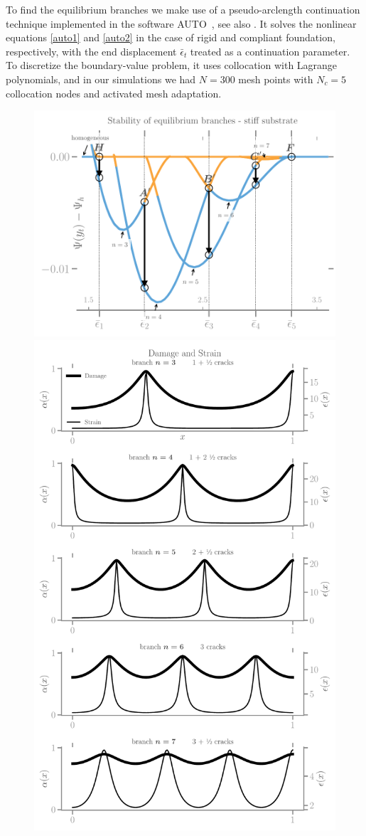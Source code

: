 To find the equilibrium branches we make use of a pseudo-arclength continuation technique implemented in the software AUTO~\cite{Doedel1981-sa},  see also \cite{Pattamatta2014-pn}. It solves the nonlinear equations \ref{auto1} and \ref{auto2} in the case of rigid and compliant foundation, respectively, with the end displacement $\bar\epsilon_t$ treated as a continuation parameter. To discretize the boundary-value problem, it uses collocation with Lagrange polynomials, and in our simulations we had $N=300$ mesh points with $N_c = 5$ collocation nodes and activated mesh adaptation. 
\begin{figure}
    \hspace*{-3cm}
\includegraphics[align=c, width=.8\textwidth]{../images/model_stiff_energy.pdf}
\includegraphics[align=c, width=.5\textwidth]{../images/model_stiff_fields.pdf}

\end{figure}
